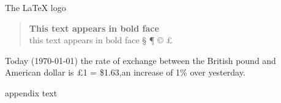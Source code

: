 \documentclass[12pt,twoside,a4paper]{article}   %
\begin{document}
	The {\LaTeX} logo

	\begin{quote}
		{\bfseries This text appears in bold face}\\
		\setlength{\parindent}{0.5cm} this text appears in bold face
		\setlength{\textwidth}{12.5cm}
			\S 
			\ddag 
			\P
			\copyright 
			\pounds			
	\end{quote}
	Today (\today) the rate of exchange between the British pound and American dollar is \pounds 1 = \$1.63,an increase of 1\% over yesterday.

	\setlength{\parskip}{1.5ex} %
	\setlength{\parindent}{0em} %
	\renewcommand{\baselinestretch}{2} %
	\setlength{\textwidth}{12.5cm} %
	\begin{appendix}
		appendix text
	\end{appendix}
\end{document}
